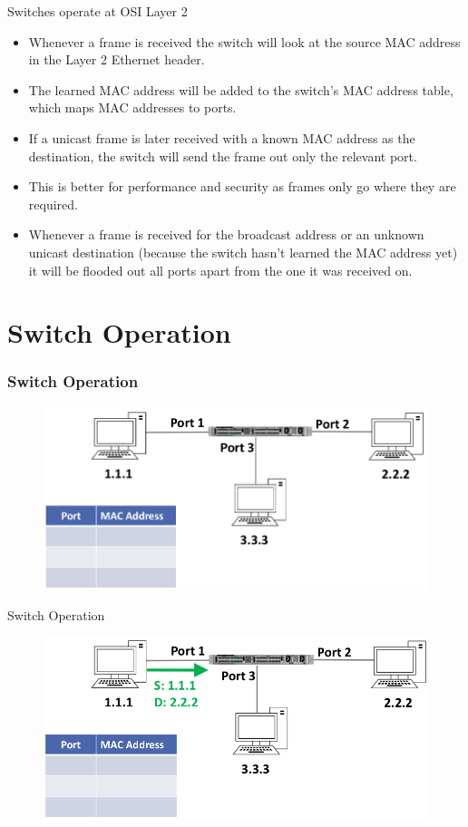 \documentclass[pdflatex,compress,mathserif]{beamer}
\begin{document}
\begin{frame}{Switches operate at OSI Layer 2}
	\begin{itemize}
		\item Whenever a frame is received the switch will look at the source MAC address in the Layer 2 Ethernet header.
		\item The learned MAC address will be added to the switch’s MAC address table, which maps MAC addresses to ports.
		\item If a unicast frame is later received with a known MAC address as the destination, the switch will send the frame out only the relevant port.
		\item This is better for performance and security as frames only go where they are required.
		\item Whenever a frame is received for the broadcast address or an unknown unicast destination (because the switch hasn’t learned the MAC address yet) it will be flooded out all ports apart from the one it was received on.
	\end{itemize}
\end{frame}

\section{Switch Operation}

\begin{frame}
	\frametitle{Switch Operation}
	\begin{figure}
		\centering
		\includegraphics[width=\linewidth]{img/img04}
	\end{figure}
\end{frame}

\begin{frame}{Switch Operation}
	\begin{figure}
		\centering
		\includegraphics[width=\linewidth]{img/img05}
	\end{figure}
\end{frame}
\end{document}

